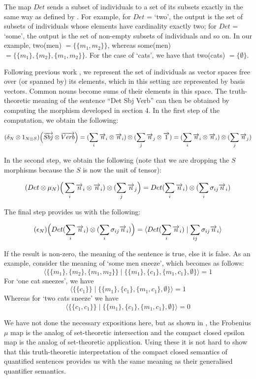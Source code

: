 The map $Det$ sends a subset of individuals to a set of its subsets exactly in the same way as defined by \cite{BarwiseCooper81}. For example, for $Det$ = `two', the output is the set of subsets  of individuals whose elements have cardinality exactly two; for $Det$ = `some', the output is the set of non-empty subsets of individuals and so on. In our example,  two(men) $= \{\{m_1, m_2\}\}$, whereas some(men) $= \{\{m_1\}, \{m_2\}, \{m_1, m_2\}\}$.  For the case of `cats', we have that two(cats) $= \{\emptyset\}$. 

Following previous work \cite{Coeckeetal}, we represent the  set of individuals   as vector spaces free over (or spanned by) its elements, which in this setting are represented by   basis vectors.  Common nouns become sums of their elements in this space. The truth-theoretic meaning of the sentence ``Det Sbj Verb'' can then be obtained  by computing the  morphism  developed in section 4. In the first step of the computation, we obtain the following:

\begin{align*}
(\delta_N \otimes 1_{N \otimes S})\Big(\overrightarrow{Sbj} \otimes \overrightarrow{Verb}\Big) =   (\sum_i \overrightarrow{n}_i \otimes \overrightarrow{n}_i) \otimes (\sum_j \overrightarrow{n}_j \otimes \overrightarrow{1}) = (\sum_i \overrightarrow{n}_i \otimes \overrightarrow{n}_i) \otimes (\sum_j \overrightarrow{n}_j)
\end{align*}

\noindent
In the second step, we obtain  the following (note that we are dropping the $S$ morphisms because the $S$ is now  the unit of tensor):

\begin{align*}
(Det \otimes  \mu_N)\Big(\sum_i \overrightarrow{n}_i \otimes \overrightarrow{n}_i) \otimes (\sum_j \overrightarrow{n}_j\Big) =  Det(\sum_i \overrightarrow{n}_i) \otimes  (\sum_i \sigma_{ij} \overrightarrow{n}_i)  
\end{align*}

\noindent
The final step  provides us with the following:

\begin{align*}
(\epsilon_{N})  \Big(Det(\sum_i \overrightarrow{n}_i) \otimes (\sum_i \sigma_{ij} \overrightarrow{n}_i)  \Big) =   \langle Det(\sum_i \overrightarrow{n}_i)  \mid \sum_{ij}  \sigma_{ij} \overrightarrow{n}_i \rangle  
\end{align*}

\noindent 
If the result is  non-zero, the meaning of the sentence is true, else it is false. 
As an example,  consider  the  meaning  of  `some men sneeze', which becomes as follows: 
\[
\langle \{\{m_1\}, \{m_2\}, \{m_1, m_2\}\} \mid \{\{m_1\}, \{c_1\}, \{m_1, c_1\}, \emptyset\} \rangle =  1
\]
For `one cat sneezes', we have
\[
\langle \{\{c_1\}\} \mid \{\{m_1\}, \{c_1\}, \{m_1, c_1\}, \emptyset\} \rangle =  1
\]
Whereas for `two cats sneeze' we have
\[
\langle \{\{c_1, c_1\}\} \mid \{\{m_1\}, \{c_1\}, \{m_1, c_1\}, \emptyset\} \rangle =  0
\]

We have not done the necessary expositions here, but as shown in \cite{CoeckePaquettePavlovic09,CoeckePaq},  the Frobenius $ \mu$ map is the analog of  set-theoretic intersection and the compact closed  epsilon map is the analog of  set-theoretic application. Using these it is not hard to show that  this truth-theoretic interpretation of the compact closed semantics of quantified sentences provides us with the same meaning as their generalised quantifier semantics.
